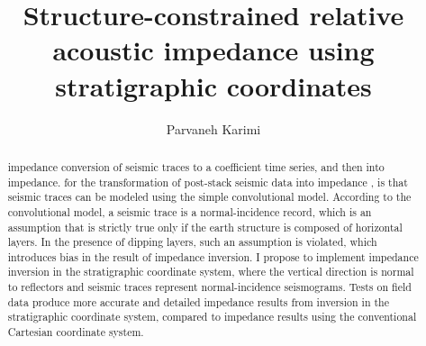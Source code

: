 
\title{Structure-constrained relative acoustic impedance using stratigraphic coordinates}


\renewcommand{\thefootnote}{\fnsymbol{footnote}} 

\author{Parvaneh Karimi}

\maketitle

\begin{abstract}
 impedance  conversion of seismic traces to a  coefficient time series, and then into  impedance.  for the transformation of post-stack seismic data into impedance , is that seismic traces can be modeled using the simple convolutional model. According to the convolutional model, a seismic trace is a normal-incidence record, which is an assumption that is strictly true only if the earth structure is composed of horizontal layers. In the presence of dipping layers, such an assumption is violated, which introduces bias in the result of impedance inversion.  I propose to implement impedance inversion in the stratigraphic coordinate system, where the vertical direction is normal to reflectors and seismic traces represent normal-incidence seismograms. Tests on field data produce more accurate and detailed impedance results from inversion in the stratigraphic coordinate system, compared to impedance results using the conventional Cartesian coordinate system.
\end{abstract}
